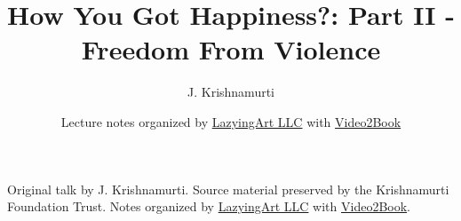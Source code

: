 \documentclass[11pt,oneside]{book}
\begin{document}
\frontmatter
\title{How You Got Happiness?: Part II - Freedom From Violence}
\author{J. Krishnamurti}
\date{Lecture notes organized by \href{https://lazying.art}{LazyingArt LLC} with \href{https://github.com/lachlanchen/Video2Book}{Video2Book}}
\maketitle
\begin{center}
\small Original talk by J. Krishnamurti. Source material preserved by the Krishnamurti Foundation Trust. Notes organized by \href{https://lazying.art}{LazyingArt LLC} with \href{https://github.com/lachlanchen/Video2Book}{Video2Book}.
\end{center}
\clearpage
\mainmatter

\end{document}
